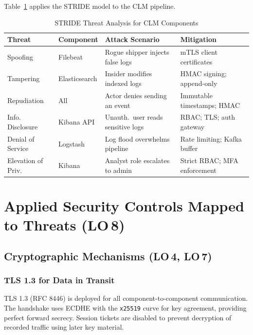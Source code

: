 \documentclass[12pt,a4paper]{report}
\begin{document}
Table~\ref{tab:threats} applies the STRIDE model to the CLM pipeline.

\begin{table}[H]
\centering
\caption{STRIDE Threat Analysis for CLM Components}
\label{tab:threats}
\begin{tabularx}{\textwidth}{llXl}
\toprule
\textbf{Threat} & \textbf{Component} & \textbf{Attack Scenario} & \textbf{Mitigation} \\
\midrule
Spoofing         & Filebeat         & Rogue shipper injects false logs         & mTLS client certificates \\
Tampering        & Elasticsearch    & Insider modifies indexed logs             & HMAC signing; append-only \\
Repudiation      & All              & Actor denies sending an event             & Immutable timestamps; HMAC \\
Info. Disclosure & Kibana API       & Unauth.\ user reads sensitive logs        & RBAC; TLS; auth gateway \\
Denial of Service& Logstash         & Log flood overwhelms pipeline             & Rate limiting; Kafka buffer \\
Elevation of Priv.& Kibana          & Analyst role escalates to admin           & Strict RBAC; MFA enforcement \\
\bottomrule
\end{tabularx}
\end{table}

\section{Applied Security Controls Mapped to Threats (LO\,8)}

\subsection{Cryptographic Mechanisms (LO\,4, LO\,7)}

\subsubsection{TLS 1.3 for Data in Transit}

TLS 1.3 (RFC 8446) is deployed for all component-to-component communication.
The handshake uses ECDHE with the \texttt{x25519} curve for key agreement,
providing perfect forward secrecy.
Session tickets are disabled to prevent decryption of recorded traffic using later
key material.
\end{document}
